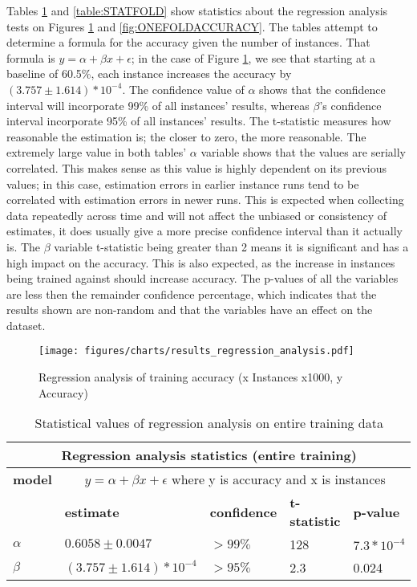 Tables \ref{table:STATENTIRE} and \ref{table:STATFOLD} show statistics about the 
regression analysis tests on Figures \ref{fig:OVERALLTRAININGACCURACY} and 
\ref{fig:ONEFOLDACCURACY}. The tables attempt to determine a formula for the 
accuracy given the number of instances. That formula is $y = \alpha + \beta x + \epsilon$;
in the case of Figure \ref{fig:OVERALLTRAININGACCURACY}, we see that starting at 
a baseline of 60.5\%, each instance increases the accuracy by $(3.757\pm1.614)*10^{-4}$.
The confidence value of $\alpha$ shows that the confidence interval will 
incorporate 99\% of all instances' results, whereas $\beta$'s confidence interval
incorporate 95\% of all instances' results.  The t-statistic measures how 
reasonable the estimation is; the closer to zero, the more reasonable. The 
extremely large value in both tables' $\alpha$ variable shows that the values are 
serially correlated.  This makes sense as this value is highly dependent on its 
previous values; in this case, estimation errors in earlier instance runs tend to 
be correlated with estimation errors in newer runs. This is expected when 
collecting data repeatedly across time and will not affect the unbiased or 
consistency of estimates, it does usually give a more precise confidence interval 
than it actually is.  The $\beta$ variable t-statistic being greater than 2 means 
it is significant and has a high impact on the accuracy.  This is also expected, 
as the increase in instances being trained against should increase accuracy. The 
p-values of all the variables are less then the remainder confidence percentage, 
which indicates that the results shown are non-random and that the variables have an 
effect on the dataset.

\begin{figure}[htp]
	\begin{center}
		\texttt{[image: figures/charts/results\_regression\_analysis.pdf]}
		\caption{Regression analysis of training accuracy (x Instances x1000, y Accuracy) \label{fig:OVERALLTRAININGACCURACY}}
	\end{center}
\end{figure}

\begin{table}[htp]
	\begin{tabular}{|l|l|l|l|l|}
		\hline \multicolumn{5}{|c|}{\bf Regression analysis statistics (entire training) } \\ \hline
			{\bf model} & \multicolumn{4}{|c|}{$y = \alpha + \beta x + \epsilon$ where y is accuracy and x is instances} \\ \hline
		            & {\bf estimate} & {\bf confidence} & {\bf t-statistic} & {\bf p-value } \\ \hline
		{\bf $\alpha$}    & $0.6058\pm0.0047$   & $>99\%$            & 128         & $7.3*10^{-4}$ \\ \hline
		{\bf $\beta$}     & $(3.757\pm1.614)*10^{-4}$ & $>95\%$        & 2.3         & 0.024 \\ \hline
		\end{tabular}
		\caption{Statistical values of regression analysis on entire training data}
		\label{table:STATENTIRE}       
\end{table}


